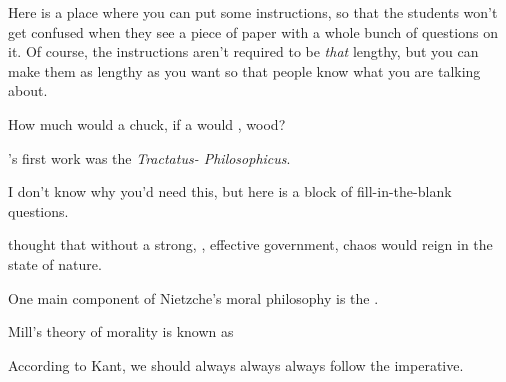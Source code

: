 \documentclass[10pt]{examdesign}
\begin{document}
\begin{fillin}[title={Fill in the blank (5 pts each)}]
  Here is a place where you can put some instructions, so that the students
  won't get confused when they see a piece of paper with a whole bunch of
  questions on it.  Of course, the instructions aren't required to
  be \emph{that} lengthy, but you can make them as lengthy as you want so that
  people know what you are talking about.

\begin{question}
  How much  would a  chuck, if a 
  would , wood?
\end{question}

\begin{question}
  's first work was the \textsl{Tractatus-
  Philosophicus}.
\end{question}

 \begin{block}
   I don't know why you'd need this, but here is a block of fill-in-the-blank
   questions. 
  \begin{question}
     thought that without a strong, ,
    effective government, chaos would reign in the state of nature.
  \end{question}

  \begin{question}
    One main component of Nietzche's moral philosophy is the .
  \end{question}
\end{block}

\begin{question}
  Mill's theory of morality is known as 
\end{question}

\begin{question}
  According to Kant, we should always always always follow the
   imperative.
\end{question}
\end{fillin}
\end{document}
